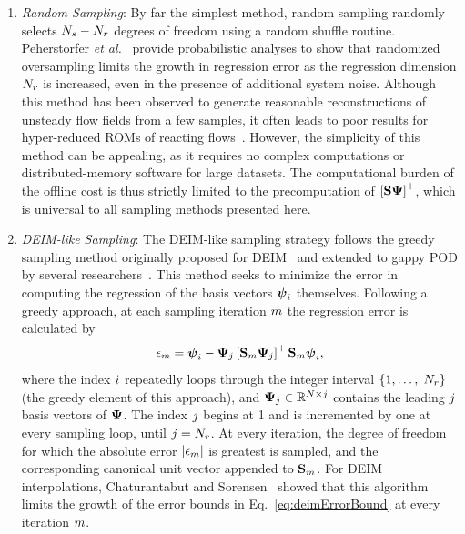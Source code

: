 \begin{enumerate}
	\item \textit{Random Sampling}: By far the simplest method, random sampling randomly selects $N_s - N_r$ degrees of freedom using a random shuffle \CC routine. Peherstorfer \textit{et al.}~\cite{Peherstorfer2020} provide probabilistic analyses to show that randomized oversampling limits the growth in regression error as the regression dimension $N_r$ is increased, even in the presence of additional system noise. Although this method has been observed to generate reasonable reconstructions of unsteady flow fields from a few samples, it often leads to poor results for hyper-reduced ROMs of reacting flows~\cite{Wentland2021}. However, the simplicity of this method can be appealing, as it requires no complex computations or distributed-memory software for large datasets. The computational burden of the offline cost is thus strictly limited to the precomputation of $\left[\sampMat \deimBasis\right]^+$, which is universal to all sampling methods presented here.

	\item \textit{DEIM-like Sampling}: The DEIM-like sampling strategy follows the greedy sampling method originally proposed for DEIM~\cite{Chaturantabut2010} and extended to gappy POD by several researchers~\cite{Zhou2012,Carlberg2013}. This method seeks to minimize the error in computing the regression of the basis vectors $\boldsymbol{\psi}_{i}$ themselves. Following a greedy approach, at each sampling iteration $m$ the regression error is calculated by
	\begin{equation}
		\errVec_{\greedyIdx} = \deimBasisVec_{\dummyIdx} - \deimBasis_{\dummyIdxTwo} \left[ \sampMat_{\greedyIdx} \deimBasis_{\dummyIdxTwo} \right]^+ \sampMat_{\greedyIdx}\deimBasisVec_{\dummyIdx},
	\end{equation}
	where the index $i$ repeatedly loops through the integer interval $\{1, \hdots, \; N_r\}$ (the greedy element of this approach), and $\deimBasis_{\dummyIdxTwo} \inRTwo{\numDOF}{\dummyIdxTwo}$ contains the leading $j$ basis vectors of $\deimBasis$. The index $j$ begins at 1 and is incremented by one at every sampling loop, until $j = N_r$. At every iteration, the degree of freedom for which the absolute error $|\epsilon_{m}|$ is greatest is sampled, and the corresponding canonical unit vector appended to $\mathbf{S}_{m}$. For DEIM interpolations, Chaturantabut and Sorensen~\cite{Chaturantabut2010} showed that this algorithm limits the growth of the error bounds in Eq.~\ref{eq:deimErrorBound} at every iteration $m$.


\end{enumerate}
